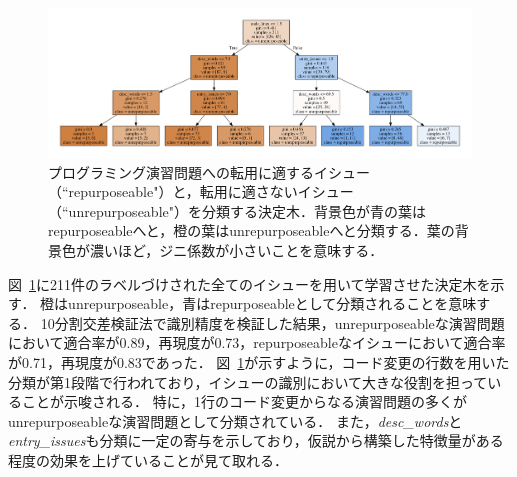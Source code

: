 \begin{figure}[t]
	\centering
  \includegraphics[width=1.0\columnwidth]{graph_20181005.png}
  \caption{プログラミング演習問題への転用に適するイシュー（``repurposeable"）と，転用に適さないイシュー（``unrepurposeable"）を分類する決定木．背景色が青の葉はrepurposeableへと，橙の葉はunrepurposeableへと分類する．葉の背景色が濃いほど，ジニ係数が小さいことを意味する．}
  \label{fig:dtgraph}
\end{figure}


図~\ref{fig:dtgraph}に211件のラベルづけされた全てのイシューを用いて学習させた決定木を示す．
橙はunrepurposeable，青はrepurposeableとして分類されることを意味する．
10分割交差検証法で識別精度を検証した結果，unrepurposeableな演習問題において適合率が0.89，再現度が0.73，repurposeableなイシューにおいて適合率が0.71，再現度が0.83であった．
図~\ref{fig:dtgraph}が示すように，コード変更の行数を用いた分類が第1段階で行われており，イシューの識別において大きな役割を担っていることが示唆される．
特に，1行のコード変更からなる演習問題の多くがunrepurposeableな演習問題として分類されている．
また，\textit{desc\_words}と\textit{entry\_issues}も分類に一定の寄与を示しており，仮説から構築した特徴量がある程度の効果を上げていることが見て取れる．




